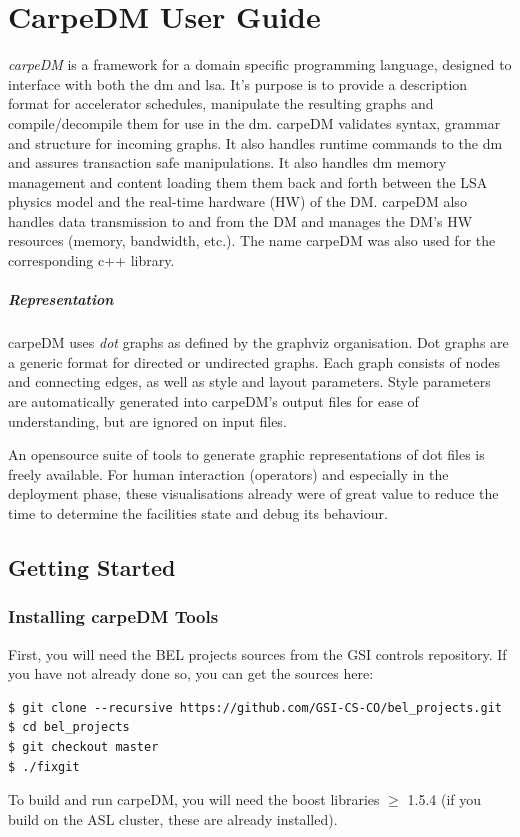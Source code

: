 
\chapter{CarpeDM User Guide}
\label{chap:userguide}
\emph{carpeDM} is a framework for a domain specific programming language, designed to interface with both the \gls{dm} and \gls{lsa}. It's purpose is to provide a description format for accelerator schedules, manipulate the resulting graphs and compile/decompile them for use in the \gls{dm}. carpeDM validates syntax, grammar and structure for incoming graphs. It also handles runtime commands to the \gls{dm} and assures transaction safe manipulations. It also handles \gls{dm} memory management and content loading them  them back and forth between the LSA physics model and the real-time hardware (HW) of the DM. carpeDM also handles data transmission to and from the DM and manages the DM's HW resources (memory, bandwidth, etc.). The name carpeDM was also used for the corresponding c++ library.
\paragraph{Representation}
carpeDM uses \emph{dot} graphs as defined by the graphviz organisation\cite{}. Dot graphs are a generic format for directed or undirected graphs. Each graph consists of nodes and connecting edges,
as well as style and layout parameters. Style parameters are automatically generated into carpeDM's output files for ease of understanding, but are ignored on input files.
\par
An opensource suite of tools to generate graphic representations of dot files is freely available. For human interaction (operators) and especially in the deployment phase, these visualisations already were of great value to reduce the time to determine the facilities state and debug its behaviour.



\section{Getting Started}

\subsection{Installing carpeDM Tools}
%
First, you will need the BEL projects sources from the GSI controls repository. If you have not already done so, you can get the sources here:
%
\begin{lstlisting}[style = customshell]
$ git clone --recursive https://github.com/GSI-CS-CO/bel_projects.git
$ cd bel_projects
$ git checkout master
$ ./fixgit
\end{lstlisting}
%
To build and run carpeDM, you will need the boost libraries $\ge$ 1.5.4 (if you build on the ASL cluster, these are already installed).


